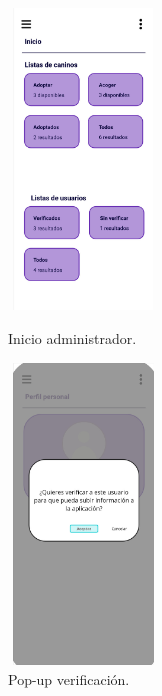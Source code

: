 \documentclass[a4paper, 12pt]{article}
\begin{document}
\begin{figure}[H]
   	\begin{minipage}{0.48\textwidth}
		\begin{center}
			{\includegraphics[height=8cm, width=4cm]{AdminPage.jpg}\par}
			\caption{Inicio administrador.}
			\medskip
		\end{center}  
	\end{minipage}\hfill
   	\begin{minipage}{0.48\textwidth}
		\begin{center}
			{\includegraphics[height=8cm, width=4cm]{VerifyAction.jpg}\par}
			\caption{Pop-up verificación.}
			\medskip
		\end{center}  
	\end{minipage}\hfill
\end{figure}
\end{document}
